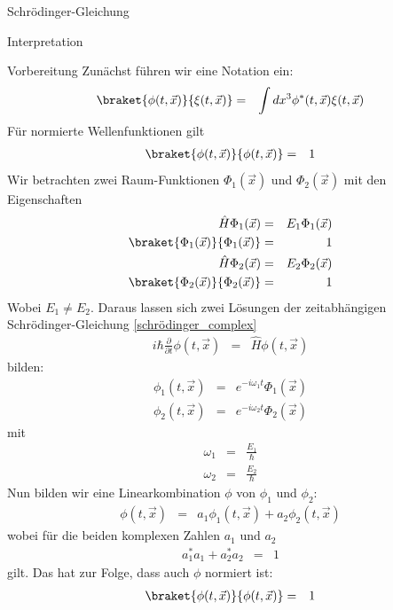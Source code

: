 \begin{chapter}{\titlestr}
\begin{section}{Schrödinger-Gleichung}
\begin{subsection}{Interpretation}
\begin{subsubsection}{Vorbereitung}
Zunächst führen wir eine Notation ein:
\begin{eqnarray*}
\braket{\phi(t,\vec{x})}{\xi(t,\vec{x})}&=&\int dx^3 \phi^*(t,\vec{x})\xi(t,\vec{x})
\end{eqnarray*}
Für normierte Wellenfunktionen gilt
\begin{eqnarray*}
\braket{\phi(t,\vec{x})}{\phi(t,\vec{x})}&=&1
\end{eqnarray*}
Wir betrachten zwei Raum-Funktionen $\Phi_1(\vec{x})$ und $\Phi_2(\vec{x})$ mit den Eigenschaften
\begin{eqnarray*}
\hat{H}\Phi_1(\vec{x}) &=& E_1\Phi_1(\vec{x})\\
\braket{\Phi_1(\vec{x})}{\Phi_1(\vec{x})} &=& 1\\
\hat{H}\Phi_2(\vec{x}) &=& E_2\Phi_2(\vec{x})\\
\braket{\Phi_2(\vec{x})}{\Phi_2(\vec{x})} &=& 1
\end{eqnarray*}
Wobei $E_1\ne E_2$. Daraus lassen sich zwei Lösungen der zeitabhängigen Schrödinger-Gleichung \ref{schrödinger_complex}
\begin{eqnarray*}
i\hbar\frac{\partial}{\partial t} \phi(t,\vec{x}) &=&\hat{H}\phi(t,\vec{x})
\end{eqnarray*}
bilden:
\begin{eqnarray*}
\phi_1(t,\vec{x}) &=& e^{-i\omega_1 t}\Phi_1(\vec{x})\\
\phi_2(t,\vec{x}) &=& e^{-i\omega_2 t}\Phi_2(\vec{x})
\end{eqnarray*}
mit
\begin{eqnarray*}
\omega_1 &=& \frac{E_1}{\hbar}\\
\omega_2 &=& \frac{E_2}{\hbar}
\end{eqnarray*}
Nun bilden wir eine Linearkombination $\phi$ von $\phi_1$ und $\phi_2$:
\begin{eqnarray}
\label{double_wave_function}
\phi(t,\vec{x}) &=& a_1\phi_1(t,\vec{x})+a_2\phi_2(t,\vec{x})
\end{eqnarray}
wobei für die beiden komplexen Zahlen $a_1$ und $a_2$
\begin{eqnarray*}
a_1^*a_1+a_2^*a_2 &=& 1
\end{eqnarray*}
gilt. Das hat zur Folge, dass auch $\phi$ normiert ist:
\begin{eqnarray*}
\braket{\phi(t,\vec{x})}{\phi(t,\vec{x})} &=& 1
\end{eqnarray*}

\end{subsubsection}
\end{subsection}
\end{section}
\end{chapter}
